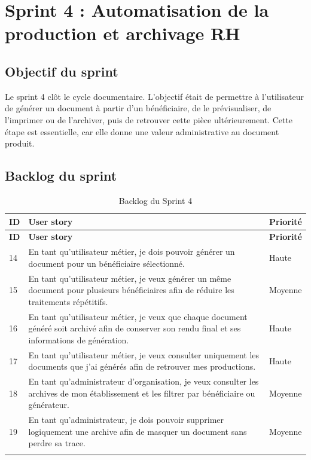 \section{Sprint 4 : Automatisation de la production et archivage RH}

\subsection{Objectif du sprint}

Le sprint 4 clôt le cycle documentaire. L'objectif était de permettre à l'utilisateur de générer un document à partir d'un bénéficiaire, de le prévisualiser, de l'imprimer ou de l'archiver, puis de retrouver cette pièce ultérieurement. Cette étape est essentielle, car elle donne une valeur administrative au document produit.

\subsection{Backlog du sprint}

\renewcommand{\arraystretch}{1.4}

\begin{longtable}{|>{\centering\arraybackslash}p{1cm}|
                  >{\raggedright\arraybackslash}p{10.4cm}|
                  >{\centering\arraybackslash}p{1.7cm}|}
\hline
\textbf{ID} & \textbf{User story} & \textbf{Priorité} \\
\hline
\endfirsthead

\hline
\textbf{ID} & \textbf{User story} & \textbf{Priorité} \\
\hline
\endhead

14 & En tant qu'utilisateur métier, je dois pouvoir générer un document pour un bénéficiaire sélectionné. & Haute \\
\hline

15 & En tant qu'utilisateur métier, je veux générer un même document pour plusieurs bénéficiaires afin de réduire les traitements répétitifs. & Moyenne \\
\hline

16 & En tant qu'utilisateur métier, je veux que chaque document généré soit archivé afin de conserver son rendu final et ses informations de génération. & Haute \\
\hline

17 & En tant qu'utilisateur métier, je veux consulter uniquement les documents que j'ai générés afin de retrouver mes productions. & Haute \\
\hline

18 & En tant qu'administrateur d'organisation, je veux consulter les archives de mon établissement et les filtrer par bénéficiaire ou générateur. & Moyenne \\
\hline

19 & En tant qu'administrateur, je dois pouvoir supprimer logiquement une archive afin de masquer un document sans perdre sa trace. & Moyenne \\
\hline

\caption{Backlog du Sprint 4}
\label{tab:backlog_sprint4}

\end{longtable}

